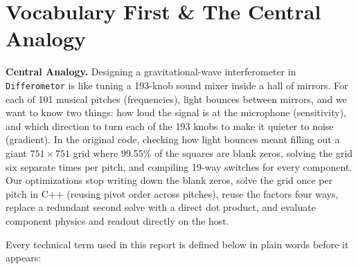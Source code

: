\documentclass[11pt,a4paper]{article}
\begin{document}
\section{Vocabulary First \& The Central Analogy}

\textbf{Central Analogy.} Designing a gravitational-wave interferometer in \texttt{Differometor} is like tuning a 193-knob sound mixer inside a hall of mirrors. For each of 101 musical pitches (frequencies), light bounces between mirrors, and we want to know two things: how loud the signal is at the microphone (sensitivity), and which direction to turn each of the 193 knobs to make it quieter to noise (gradient). In the original code, checking how light bounces meant filling out a giant $751\times 751$ grid where 99.55\% of the squares are blank zeros, solving the grid six separate times per pitch, and compiling 19-way switches for every component. Our optimizations stop writing down the blank zeros, solve the grid once per pitch in C++ (reusing pivot order across pitches), reuse the factors four ways, replace a redundant second solve with a direct dot product, and evaluate component physics and readout directly on the host.

Every technical term used in this report is defined below in plain words before it appears:
\end{document}
